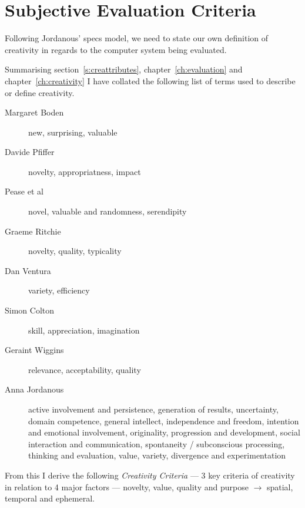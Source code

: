 \section{Subjective Evaluation Criteria}

Following Jordanous' \gls{specs} model, we need to state our own definition of creativity in regards to the computer system being evaluated.

Summarising section~\ref{s:creattributes}, chapter~\ref{ch:evaluation} and chapter~\ref{ch:creativity} I have collated the following list of terms used to describe or define creativity.

\begin{description}
  \item [Margaret Boden] new, surprising, valuable \autocite{Boden2003}
  \item [Davide Pfiffer] novelty, appropriatness, impact \autocite{Piffer2012}
  \item [Pease et al] novel, valuable \autocite{Pease2001} and randomness, serendipity \autocite{Pease2013}
  \item [Graeme Ritchie] novelty, quality, typicality \autocite{Ritchie2007}
  \item [Dan Ventura] variety, efficiency \autocite{Ventura2008}
  \item [Simon Colton] skill, appreciation, imagination \autocite{Colton2008a, Colton2008}
  \item [Geraint Wiggins] relevance, acceptability, quality \autocite{Wiggins2006}
  \item [Anna Jordanous] active involvement and persistence, generation of results, uncertainty, domain competence, general intellect, independence and freedom, intention and emotional involvement, originality, progression and development, social interaction and communication, spontaneity / subconscious processing, thinking and evaluation, value, variety, divergence and experimentation \autocite{Jordanous2012}
\end{description}

From this I derive the following \hypertarget{creadef}{\textit{Creativity Criteria}} --- 3 key criteria of creativity in relation to 4 major factors --- novelty, value, quality and purpose $\to$ spatial, temporal and ephemeral.


